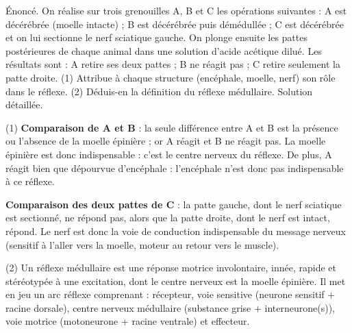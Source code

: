 \documentclass[11pt]{article}
\newcommand{\cle}[1]{{\popxbold\color{popdark}#1}}
\begin{document}
\begin{exoresolu}
Énoncé. On réalise sur trois grenouilles A, B et C les opérations suivantes : A est décérébrée (moelle intacte) ; B est décérébrée puis démédullée ; C est décérébrée et on lui sectionne le nerf sciatique gauche. On plonge ensuite les pattes postérieures de chaque animal dans une solution d'acide acétique dilué. Les résultats sont : A retire ses deux pattes ; B ne réagit pas ; C retire seulement la patte droite. (1) Attribue à chaque structure (encéphale, moelle, nerf) son rôle dans le réflexe. (2) Déduis-en la définition du réflexe médullaire.
\tcblower
Solution détaillée.

(1) \textbf{Comparaison de A et B} : la seule différence entre A et B est la présence ou l'absence de la moelle épinière ; or A réagit et B ne réagit pas. La moelle épinière est donc indispensable : c'est le \cle{centre nerveux} du réflexe. De plus, A réagit bien que dépourvue d'encéphale : l'encéphale n'est donc pas indispensable à ce réflexe.

\textbf{Comparaison des deux pattes de C} : la patte gauche, dont le nerf sciatique est sectionné, ne répond pas, alors que la patte droite, dont le nerf est intact, répond. Le nerf est donc la \cle{voie de conduction} indispensable du message nerveux (sensitif à l'aller vers la moelle, moteur au retour vers le muscle).

(2) Un \cle{réflexe médullaire} est une réponse motrice involontaire, innée, rapide et stéréotypée à une excitation, dont le centre nerveux est la moelle épinière. Il met en jeu un arc réflexe comprenant : récepteur, voie sensitive (neurone sensitif + racine dorsale), centre nerveux médullaire (substance grise + interneurone(s)), voie motrice (motoneurone + racine ventrale) et effecteur.
\end{exoresolu}
\end{document}
